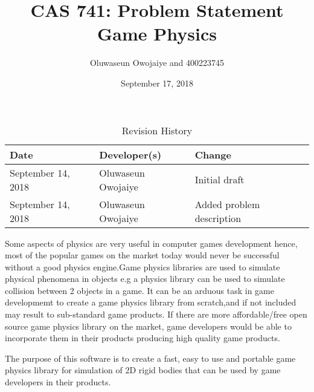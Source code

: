 \documentclass{article}
\title{CAS 741: Problem Statement\\Game Physics}
\author{Oluwaseun Owojaiye and 400223745}
\date{September 17, 2018}
\begin{document}
\maketitle

\begin{table}[hp]
\caption{Revision History} \label{TblRevisionHistory}
\begin{tabularx}{\textwidth}{llX}
\toprule
\textbf{Date} & \textbf{Developer(s)} & \textbf{Change}\\
\midrule
September 14, 2018 & Oluwaseun Owojaiye & Initial draft\\
September 14, 2018 & Oluwaseun Owojaiye & Added problem description\\
\bottomrule
\end{tabularx}
\end{table}


Some aspects of physics are very useful in computer games development hence, most of the popular games on the market
today would never be successful without a good physics engine.Game physics libraries are used to simulate physical
phenomena in objects e.g a physics library can be used to simulate collision between 2 objects in a game. It can be an
arduous task in game developmemt to create a game physics library from scratch,and if not included may result to sub-standard game products.
If there are more affordable/free open source game physics library on the market, game developers would be able to incorporate them in their products producing high quality game products.

The purpose of this software is to create a fast, easy to use and portable game physics library for simulation of 2D rigid 
bodies that can be used by game developers in their products.
\end{document}
